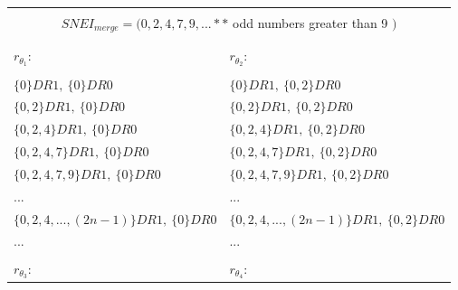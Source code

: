 	\newpage
		\begin{table}[h!]
		\begin{center}
			\begin{tabular}{|l||l|}
				\hline
					\multicolumn{2}{|c|}{\cellcolor{brightlavender}  } \\
					\multicolumn{2}{|c|}{\cellcolor{brightlavender} {\huge $SNEI_{merge} = (0, 2, 4, 7, 9, ...**$} odd numbers greater than 9    {\huge $)$}  }\\
					\multicolumn{2}{|c|}{\cellcolor{brightlavender}  } \\
				\hline
				\hline
					\cellcolor{brightlavender!50} & \cellcolor{brightlavender!50}  \\
					\cellcolor{brightlavender!50} {\LARGE $r_{\theta_{1}}$:  } & \cellcolor{brightlavender!50} {\LARGE $r_{\theta_{2}}$:  } \\
					\cellcolor{brightlavender!50} & \cellcolor{brightlavender!50}  \\
				\hline
				\hline
					$\{0\}DR1,\:\{0\}DR0$ &
					$\{0\}DR1,\:\{0, 2\}DR0$ \\
					$\{0, 2\}DR1,\:\{0\}DR0$ &
					$\{0, 2\}DR1,\:\{0, 2\}DR0$ \\
					$\{0, 2, 4\}DR1,\:\{0\}DR0$ &
					$\{0, 2, 4\}DR1,\:\{0, 2\}DR0$ \\
					$\{0, 2, 4, 7\}DR1,\:\{0\}DR0$ &
					$\{0, 2, 4, 7\}DR1,\:\{0, 2\}DR0$ \\
					$\{0, 2, 4, 7, 9\}DR1,\:\{0\}DR0$ &
					$\{0, 2, 4, 7, 9\}DR1,\:\{0, 2\}DR0$ \\
					... & ... \\
					$\{0, 2, 4, ... , (2n-1)\}DR1,\:\{0\}DR0$ &
					$\{0, 2, 4, ... , (2n-1)\}DR1,\:\{0, 2\}DR0$ \\				
					... & ... \\						
				\hline
				\hline
					\cellcolor{brightlavender!50} & \cellcolor{brightlavender!50}  \\
					\cellcolor{brightlavender!50} {\LARGE $r_{\theta_{3}}$:  } & \cellcolor{brightlavender!50} {\LARGE $r_{\theta_{4}}$:  } \\

\end{tabular}
\end{center}
\end{table}
